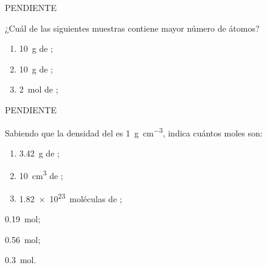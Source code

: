 \documentclass[10pt,a5paper,twoside]{article}
\begin{document}
  \begin{solution}
    PENDIENTE %
  \end{solution}




  \begin{exercise}[
      tags    = {termodinámica, entalpía, entalpia de reacción, calor},
      topics  = {química, termoquímica, termodinámica},
      source  = {FQ 1B OXF 2015, p43, e31},
    ]
    ¿Cuál de las siguientes muestras contiene mayor número de átomos?
    \begin{enumerate}
      \item \SI{10}{\gram} de ;
      \item \SI{10}{\gram} de ;
      \item \SI{2}{\mole} de ;
    \end{enumerate}
  \end{exercise}

  \begin{solution}
    PENDIENTE %
  \end{solution}




  \begin{exercise}[
      tags    = {termodinámica, entalpía, entalpia de reacción, calor},
      topics  = {química, termoquímica, termodinámica},
      source  = {FQ 1B OXF 2015, p43, e34},
    ]
    Sabiendo que la densidad del  es \SI{1}{\gram\per\cubic\centi\meter}, indica cuántos moles son:
    \begin{enumerate}
      \item \SI{3.42}{\gram} de ;
      \item \SI{10}{\cubic\centi\meter} de ;
      \item \SI{1.82e23}{moléculas} de ;
    \end{enumerate}
  \end{exercise}

  \begin{solution}
    \begin{enumerate*}
      \item \SI{0.19}{\mole};
      \item \SI{0.56}{\mole};
      \item \SI{0.3}{\mole}.
    \end{enumerate*}
  \end{solution}
\end{document}
